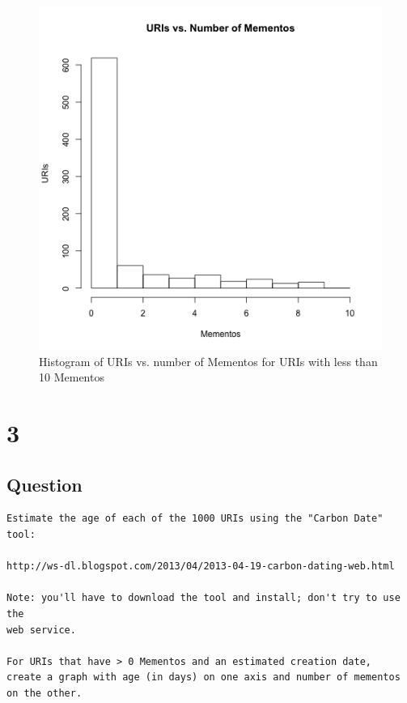 \documentclass[letterpaper,11pt]{article}
\begin{document}
\begin{figure}
\includegraphics[scale=0.7]{work/q2/q2-histogram3.png}
\caption{Histogram of URIs vs. number of Mementos for URIs with less than 10 Mementos}
\label{fig:q2histy3}
\end{figure}

\newpage



\newpage
\section*{3}

\subsection*{Question}

\begin{verbatim}
Estimate the age of each of the 1000 URIs using the "Carbon Date" tool:

http://ws-dl.blogspot.com/2013/04/2013-04-19-carbon-dating-web.html

Note: you'll have to download the tool and install; don't try to use the 
web service.  

For URIs that have > 0 Mementos and an estimated creation date,
create a graph with age (in days) on one axis and number of mementos
on the other.
\end{verbatim}
\end{document}
